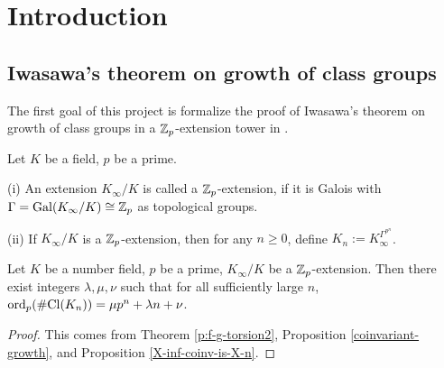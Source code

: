 %

\tableofcontents

\section{Introduction}

\subsection{Iwasawa's theorem on growth of class groups}

The first goal of this project is formalize the proof of
Iwasawa's theorem on growth of class groups in a ${\mathbb {Z}}_p$-extension tower
in {\Lean}.

\begin{definition}
\label{Zp-ext-def}
\leanok
Let $K$ be a field, $p$ be a prime.

{\rm(i)} An extension $K_\infty/K$ is called a ${\mathbb {Z}}_p$-extension,
if it is Galois with $\Gamma={\mathrm{Gal}}(K_\infty/K)\cong{\mathbb {Z}}_p$
as topological groups.

{\rm(ii)} If $K_\infty/K$ is a ${\mathbb {Z}}_p$-extension, then for any
$n\geq 0$, define $K_n:=K_\infty^{\Gamma^{p^n}}$.
\end{definition}

\begin{thm}
\label{clgp-growth}
\leanok
Let $K$ be a number field, $p$ be a prime,
$K_\infty/K$ be a ${\mathbb {Z}}_p$-extension.
Then there exist integers $\lambda,\mu,\nu$
such that for all sufficiently large $n$,
$\operatorname{ord}_p(\#{\mathrm{Cl}}(K_n))=\mu p^n+\lambda n+\nu$.
\end{thm}

\begin{proof}
This comes from Theorem \ref{p:f-g-torsion2},
Proposition \ref{coinvariant-growth},
and Proposition \ref{X-inf-coinv-is-X-n}.
\end{proof}

